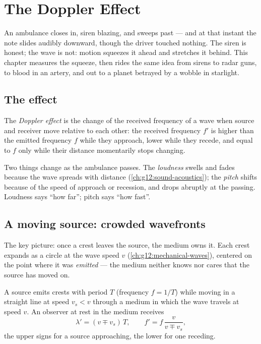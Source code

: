 \chapter{The Doppler Effect}\label{ch:g12:doppler-effect}

An ambulance closes in, siren blazing, and sweeps past --- and at that instant the note
slides audibly downward, though the driver touched nothing. The siren is honest; the wave
is not: motion squeezes it ahead and stretches it behind. This chapter measures the squeeze,
then rides the same idea from sirens to radar guns, to blood in an artery, and out to a
planet betrayed by a wobble in starlight.

\section{The effect}

\begin{definition}\label{def:g12:doppler-effect:doppler}
The \emph{Doppler effect} is the change of the received frequency
of a wave when source and receiver move relative to each other: the received frequency
$f'$ is higher than the emitted frequency $f$ while they approach, lower while they
recede, and equal to $f$ only while their distance momentarily stops changing.
\end{definition}

\begin{remark}\label{rem:g12:doppler-effect:pitch}
Two things change as the ambulance passes. The \emph{loudness} swells and fades because
the wave spreads with distance (\cref{ch:g12:sound-acoustics}); the \emph{pitch} shifts
because of the speed of approach or recession, and drops abruptly at the passing.
Loudness says ``how far''; pitch says ``how fast''.
\end{remark}

\section{A moving source: crowded wavefronts}

The key picture: once a crest leaves the source, the medium owns it. Each crest expands as
a circle at the wave speed $v$ (\cref{ch:g12:mechanical-waves}), centered on the point where
it was \emph{emitted} --- the medium neither knows nor cares that the source has moved on.

\begin{proposition}\label{prop:g12:doppler-effect:moving-source}
A source emits crests with period $T$ (frequency $f = 1/T$) while moving in a straight
line at speed $v_s < v$ through a medium in which the wave travels at speed $v$. An
observer at rest in the medium receives
\[
\lambda' = (v \mp v_s)\,T, \qquad f' = f\,\frac{v}{v \mp v_s},
\]
the upper signs for a source approaching, the lower for one receding.
\end{proposition}

